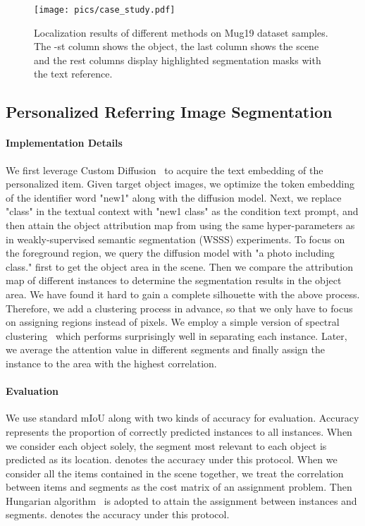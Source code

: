 \documentclass[letterpaper]{article} \usepackage[submission]{aaai24}  \usepackage{times}  \usepackage{helvet}  \usepackage{courier}  \usepackage[hyphens]{url}  \usepackage{graphicx} \urlstyle{rm} \def\UrlFont{\rm}  \usepackage{natbib}  \usepackage{caption} \frenchspacing  \setlength{\pdfpagewidth}{8.5in} \setlength{\pdfpageheight}{11in} \usepackage{algorithm}
\begin{document}
\begin{figure*}
  \centering
  \texttt{[image: pics/case\_study.pdf]}
  \caption{
  Localization results of different methods on Mug19 dataset samples.
  The -st column shows the object, the last column shows the scene and the rest columns display highlighted segmentation masks with the text reference.
  }
  \label{fig:case}
\end{figure*}

\subsection{Personalized Referring Image Segmentation}
\label{sec:personalized}

\paragraph{Implementation Details}

We first leverage Custom Diffusion~\cite{customdiffusion} to acquire the text embedding of the personalized item.
Given target object images, we optimize the token embedding of the identifier word "new1" along with the diffusion model.
Next, we replace "class" in the textual context with "new1 class" as the condition text prompt, and then attain the object attribution map from  using the same hyper-parameters as in weakly-supervised semantic segmentation (WSSS) experiments.
To focus on the foreground region, we query the diffusion model with "a photo including class." first to get the object area in the scene.
Then we compare the attribution map of different instances to determine the segmentation results in the object area.
We have found it hard to gain a complete silhouette with the above process.
Therefore, we add a clustering process in advance, so that we only have to focus on assigning regions instead of pixels.
We employ a simple version of spectral clustering~\cite{spectral} which performs surprisingly well in separating each instance.
Later, we average the attention value in different segments and finally assign the instance to the area with the highest correlation.


\paragraph{Evaluation}

We use standard mIoU along with two kinds of accuracy for evaluation.
Accuracy represents the proportion of correctly predicted instances to all instances.
When we consider each object solely, the segment most relevant to each object is predicted as its location.
 denotes the accuracy under this protocol.
When we consider all the items contained in the scene together, we treat the correlation between items and segments as the cost matrix of an assignment problem.
Then Hungarian algorithm~\cite{hungarian} is adopted to attain the assignment between instances and segments. 
 denotes the accuracy under this protocol.
\end{document}
